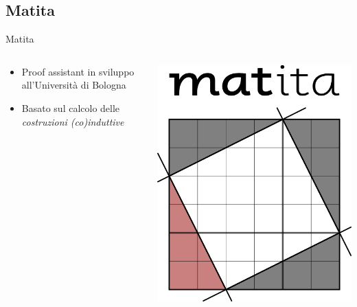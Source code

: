 \documentclass{beamer}
\begin{document}
\subsection{Matita}
\begin{frame}{Matita}
\begin{columns}
  \begin{column}{.5\textwidth}
    \begin{itemize}
      \item Proof assistant in sviluppo all'Università di Bologna
      \vspace{1.5em}
      \item Basato sul calcolo delle \textit{costruzioni (co)induttive}
    \end{itemize}
  \end{column}
  \begin{column}{.5\textwidth}
    \begin{center}
        \includegraphics[scale=0.30]{matita.png}
    \end{center}
  \end{column}
\end{columns}
\end{frame}
\end{document}
